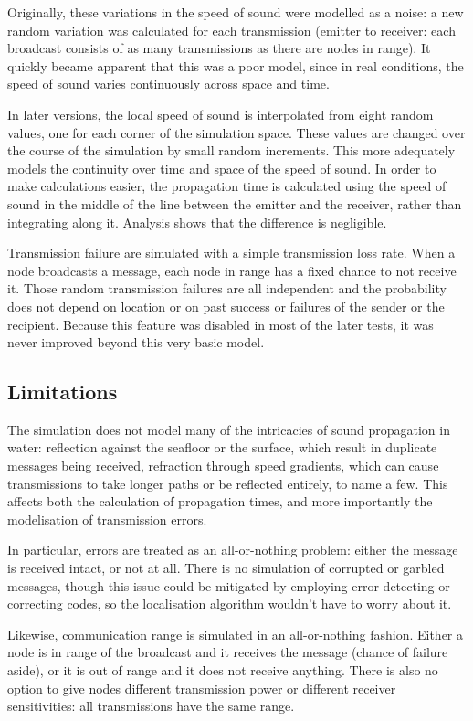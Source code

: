 \documentclass[12pt,a4paper,fleqn]{report}
\begin{document}
Originally, these variations in the speed of sound were modelled as a noise: a new random variation was calculated for each transmission (emitter to receiver: each broadcast consists of as many transmissions as there are nodes in range). It quickly became apparent that this was a poor model, since in real conditions, the speed of sound varies continuously across space and time.

In later versions, the local speed of sound is interpolated from eight random values, one for each corner of the simulation space. These values are changed over the course of the simulation by small random increments. This more adequately models the continuity over time and space of the speed of sound. In order to make calculations easier, the propagation time is calculated using the speed of sound in the middle of the line between the emitter and the receiver, rather than integrating along it. Analysis shows that the difference is negligible.

Transmission failure are simulated with a simple transmission loss rate. When a node broadcasts a message, each node in range has a fixed chance to not receive it. Those random transmission failures are all independent and the probability does not depend on location or on past success or failures of the sender or the recipient. Because this feature was disabled in most of the later tests, it was never improved beyond this very basic model.

\subsection{Limitations}

The simulation does not model many of the intricacies of sound propagation in water: reflection against the seafloor or the surface, which result in duplicate messages being received, refraction through speed gradients, which can cause transmissions to take longer paths or be reflected entirely, to name a few. This affects both the calculation of propagation times, and more importantly the modelisation of transmission errors.

In particular, errors are treated as an all-or-nothing problem: either the message is received intact, or not at all. There is no simulation of corrupted or garbled messages, though this issue could be mitigated by employing error-detecting or -correcting codes, so the localisation algorithm wouldn't have to worry about it.

Likewise, communication range is simulated in an all-or-nothing fashion. Either a node is in range of the broadcast and it receives the message (chance of failure aside), or it is out of range and it does not receive anything. There is also no option to give nodes different transmission power or different receiver sensitivities: all transmissions have the same range.
\end{document}
